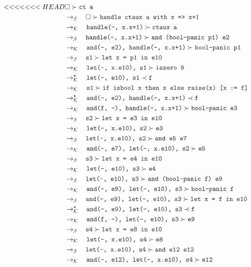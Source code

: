 \documentclass{article}
\newcommand{\tx}[1]{\textcolor{Black} {\texttt{#1}}}
\newcommand{\es}{$\square$}
\newcommand{\pop}[2]{ \tx{#1} \succ \tx{#2}}
\newcommand{\push}[2]{ \tx{#1} \prec \tx{#2}}
\newcommand{\kr}{\rightarrow_{\mathcal{K}} \quad}
\newcommand{\br}{\rightarrow_{\beta} \quad}
\newcommand{\krs}{\rightarrow_{\mathcal{K}}^{\star} \quad}
\begin{document}
\begin{enumerate}
        \begin{align*}
<<<<<<< HEAD
        &\pop{\es}{ct a}\\
        &\br \pop{\es}{handle ctaux a with x => x+1}\\
        &\kr \pop{handle(-, x.x+1)}{ctaux a}\\
        &\br \pop{handle(-, x.x+1)}{and (bool-panic p1) e2}\\
        &\kr \pop{and(-, e2), handle(-, x.x+1)}{bool-panic p1}\\
        &\br \pop{s1}{let x = p1 in e10}\\
        &\kr \pop{let(-, x.e10), s1}{iszero 9}\\
        &\krs \push{let(-, e10), s1}{f}\\
        &\kr \pop{s1}{if isbool x then x else raise(x) [x := f]}\\
        &\krs \push{and(-, e2), handle(-, x.x+1)}{f}\\
        &\kr \pop{and(f, -), handle(-, x.x+1)}{bool-panic e3}\\
        &\br \pop{s2}{let x = e3 in e10}\\
        &\kr \pop{let(-, x.e10), s2}{e3}\\
        &\br \pop{let(-, x.e10), s2}{and e5 e7}\\
        &\kr \pop{and(-, e7), let(-, x.e10), s2}{e5}\\
        &\br \pop{s3}{let x = e4 in e10}\\
        &\kr \pop{let(-, e10), s3}{e4}\\
        &\br \pop{let(-, e10), s3}{and (bool-panic f) e9}\\
        &\kr \pop{and(-, e9), let(-, e10), s3}{bool-panic f}\\
        &\br \pop{and(-, e9), let(-, e10), s3}{let x = f in e10}\\
        &\krs \push{and(-, e9), let(-, e10), s3}{f}\\
        &\kr \pop{and(f, -), let(-, e10), s3}{e9}\\
        &\br \pop{s4}{let x = e8 in e10}\\
        &\kr \pop{let(-, x.e10), s4}{e8}\\
        &\br \pop{let(-, x.e10), s4}{and e12 e12}\\
        &\kr \pop{and(-, e12), let(-, x.e10), s4}{e12}\\

\end{align*}
\end{enumerate}
\end{document}
